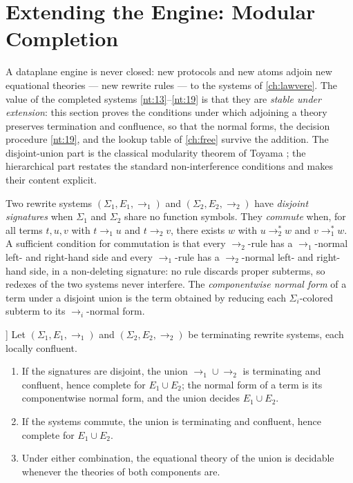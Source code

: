 \section{Extending the Engine: Modular Completion}\label{sec:rewrite-modular}

A dataplane engine is never closed: new protocols and new atoms adjoin
new equational theories --- new rewrite rules --- to the systems of
\autoref{ch:lawvere}. The value of the completed systems
\ref{nt:13}--\ref{nt:19} is that they are \emph{stable under extension}:
this section proves the conditions under which adjoining a theory
preserves termination and confluence, so that the normal forms, the
decision procedure \ref{nt:19}, and the lookup table of \autoref{ch:free}
survive the addition. The disjoint-union part is the classical modularity
theorem of Toyama \citep{toyama}; the hierarchical part restates the
standard non-interference conditions and makes their content explicit.

\begin{definition}\label{def:modular}
Two rewrite systems $(\Sigma_1, E_1, \to_1)$ and $(\Sigma_2, E_2, \to_2)$
have \emph{disjoint signatures} when $\Sigma_1$ and $\Sigma_2$ share no
function symbols. They \emph{commute} when, for all terms $t, u, v$ with
$t \to_1 u$ and $t \to_2 v$, there exists $w$ with $u \to_2^* w$ and
$v \to_1^* w$. A sufficient condition for commutation is that every
$\to_2$-rule has a $\to_1$-normal left- and right-hand side and every
$\to_1$-rule has a $\to_2$-normal left- and right-hand side, in a
non-deleting signature: no rule discards proper subterms, so redexes of
the two systems never interfere. The \emph{componentwise normal form}
of a term under a disjoint union is the term obtained by reducing each
$\Sigma_i$-colored subterm to its $\to_i$-normal form.
\end{definition}

\begin{theorem}[Modular completion, NT54 [N]]\label{nt:54}
Let $(\Sigma_1, E_1, \to_1)$ and $(\Sigma_2, E_2, \to_2)$ be terminating
rewrite systems, each locally confluent.
\begin{enumerate}
\item[(i)] If the signatures are disjoint, the union
$\to_1 \cup \to_2$ is terminating and confluent, hence complete for
$E_1 \cup E_2$; the normal form of a term is its componentwise normal
form, and the union decides $E_1 \cup E_2$.
\item[(ii)] If the systems commute, the union is terminating and
confluent, hence complete for $E_1 \cup E_2$.
\item[(iii)] Under either combination, the equational theory of the
union is decidable whenever the theories of both components are.
\end{enumerate}
\end{theorem}

